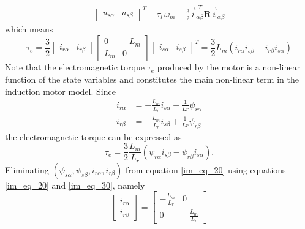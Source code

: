\documentclass[12pt,a4paper,oneside]{book}
\begin{document}
\begin{onehalfspace}
\begin{equation}
\begin{aligned}
		\left[\begin{matrix}
			u_{s\alpha} & u_{s\beta}
		\end{matrix}\right]^T 
		-\tau_l\,\omega_m-\frac{3}{2}\vec{i}_{\alpha\beta}^{\,\,T}\mathbf{R}\vec{i}_{\alpha\beta}
	\end{aligned}
\end{equation}
which means 
\begin{equation}\label{im_eq_29}
	\tau_e = 
	\frac{3}{2}\left[\begin{matrix}
		i_{r\alpha} & i_{r\beta}
	\end{matrix}\right]
	\left[\begin{matrix}
		0 & -L_m \\
		L_m & 0
	\end{matrix}\right]
	\left[\begin{matrix}
		i_{s\alpha} & i_{s\beta}
	\end{matrix}\right]^T = 
	\frac{3}{2}L_m\left(i_{r\alpha} i_{s\beta} - i_{r\beta} i_{s\alpha}\right)
\end{equation}
Note that the electromagnetic torque $\tau_e$ produced by the motor is a 
non-linear function of the state variables and constitutes the main non-linear 
term in the induction motor model. Since
\begin{equation}\label{im_eq_30}
	\begin{aligned}
		i_{r\alpha} &= -\frac{L_m}{L_r}i_{s\alpha}+\frac{1}{Lr}\psi_{r\alpha} 
		\\[8pt]
		i_{r\beta} &= -\frac{L_m}{L_r}i_{s\beta}+\frac{1}{Lr}\psi_{r\beta}
	\end{aligned}
\end{equation}
the electromagnetic torque can be expressed as
\begin{equation}\label{im_eq_31}
	\tau_{e} = 
	\frac{3}{2}\frac{L_m}{L_r}\left(\psi_{r\alpha}i_{s\beta}-\psi_{r\beta}i_{s\alpha}\right).
\end{equation}
Eliminating $\left(\psi_{s\alpha}, \psi_{s\beta}, i_{r\alpha}, 
i_{r\beta}\right)$ from equation  \ref{im_eq_20} using equations \ref{im_eq_20} 
and \ref{im_eq_30}, namely
\begin{equation}\label{im_eq_32}
	\left[\begin{matrix}
		i_{r\alpha} \\[6pt]
		i_{r\beta}
	\end{matrix}\right] = 
	\left[\begin{matrix}
		-\frac{L_m}{L_r} & 0 \\[6pt]
		0 & -\frac{L_m}{L_r}
	\end{matrix}\right]

\end{equation}
\end{onehalfspace}
\end{document}
